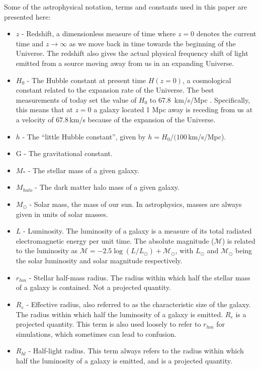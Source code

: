 Some of the astrophysical notation, terms and constants used in this paper are presented here:

\begin{itemize}
    \item $z$ - Redshift, a dimensionless measure of time where $z=0$ denotes the current time and $z \rightarrow \infty$ as we move back in time towards the beginning of the Universe. The redshift also gives the actual physical frequency shift of light emitted from a source moving away from us in an expanding Universe.
    \item $H_{0}$ - The Hubble constant at present time $H(z=0)$, a cosmological constant related to the expansion rate of the Universe. The best measurements of today set the value of $H_0$ to $67.8\, $ km/s/Mpc \parencite{Planck2016}. Specifically, this means that at $z=0$ a galaxy located 1 Mpc away is receding from us at a velocity of $67.8\,$km/s because of the expansion of the Universe.
    \item $h$ - The ``little Hubble constant'', given by $h = H_0 /(100\,$km/s/Mpc).
    \item G - The gravitational constant. 
    \item $M_{\ast}$ - The stellar mass of a given galaxy.
    \item $M_{halo}$ - The dark matter halo mass of a given galaxy.
    \item $M_{\odot}$ - Solar mass, the mass of our sun. In astrophysics, masses are always given in units of solar masses.
    \item $L$ - Luminosity. The luminosity of a galaxy is a measure of its total radiated electromagnetic energy per unit time. The absolute magnitude ($\mathcal{M}$) is related to the luminosity as $\mathcal{M} = -2.5 \log(L/L_\odot) + \mathcal{M}_\odot$, with $L_\odot$ and $\mathcal{M}_\odot$ being the solar luminosity and solar magnitude respectively.
    \item $r_{hm}$ - Stellar half-mass radius. The radius within which half the stellar mass of a galaxy is contained. Not a projected quantity.
    \item $R_e$ - Effective radius, also referred to as the characteristic size of the galaxy. The radius within which half the luminosity of a galaxy is emitted. $R_e$ is a projected quantity. This term is also used loosely to refer to $r_{hm}$ for simulations, which sometimes can lead to confusion.
    \item $R_{hl}$ - Half-light radius. This term always refers to the radius within which half the luminosity of a galaxy is emitted, and is a projected quantity.
\end{itemize}

